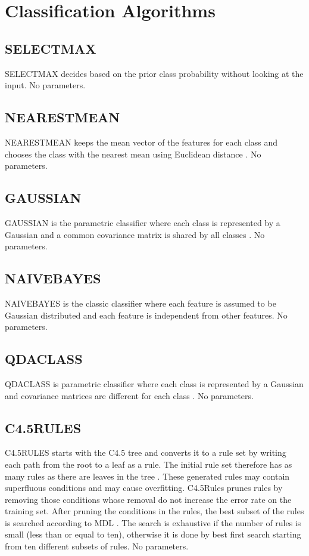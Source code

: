 \documentclass[a4paper,12pt]{book}
\begin{document}
\section{Classification Algorithms}

\subsection{SELECTMAX}
SELECTMAX decides based on the prior class probability without looking at the input. No parameters.

\subsection{NEARESTMEAN}
NEARESTMEAN keeps the mean vector of the features for each class and chooses the class with the nearest mean using Euclidean distance \cite{alpaydin04}. No parameters.

\subsection{GAUSSIAN}
GAUSSIAN is the parametric classifier where each class is represented by a Gaussian and a common covariance matrix is shared by all classes \cite{alpaydin04}. No parameters.

\subsection{NAIVEBAYES}
NAIVEBAYES is the classic classifier where each feature is assumed to be Gaussian distributed \cite{alpaydin04} and each feature is independent from other features. No parameters.

\subsection{QDACLASS}
QDACLASS is parametric classifier where each class is represented by a Gaussian and covariance matrices are different for each class \cite{alpaydin04}. No parameters.

\subsection{C4.5RULES}
C4.5RULES starts with the C4.5 tree and converts it to a rule set by writing each path from the root to a leaf as a rule. The initial rule set therefore has as many rules as there are leaves in the tree \cite{quinlan93}. These generated rules may contain superfluous conditions and may cause overfitting. C4.5Rules prunes rules by removing those conditions whose removal do not increase the error rate on the training set. After pruning the conditions in the rules, the best subset of the rules is searched according to MDL \cite{quinlan89}. The search is exhaustive if the number of rules is small (less than or equal to ten), otherwise it is done by best first search starting from ten different subsets of rules. No parameters.
\end{document}
